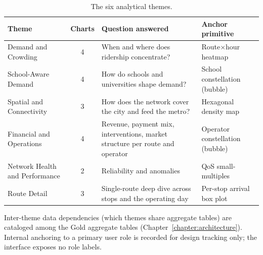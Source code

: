 \begin{table}[!htbp]
  \centering
  \caption{The six analytical themes.}
  \label{tab:themes:six}
  \footnotesize
  \renewcommand{\arraystretch}{1.3}
  \begin{tabularx}{\linewidth}{p{3.0cm} c X p{2.6cm}}
    \hline
    \textbf{Theme} & \textbf{Charts} & \textbf{Question answered} & \textbf{Anchor primitive} \\
    \hline
    Demand and Crowding            & 4 & When and where does ridership concentrate?                                      & Route$\times$hour heatmap \\
    School-Aware Demand            & 4 & How do schools and universities shape demand?                                   & School constellation (bubble) \\
    Spatial and Connectivity       & 3 & How does the network cover the city and feed the metro?                         & Hexagonal density map \\
    Financial and Operations       & 4 & Revenue, payment mix, interventions, market structure per route and operator    & Operator constellation (bubble) \\
    Network Health and Performance & 2 & Reliability and anomalies                                                       & QoS small-multiples \\
    Route Detail                   & 3 & Single-route deep dive across stops and the operating day                       & Per-stop arrival box plot \\
    \hline
  \end{tabularx}
\end{table}

Inter-theme data dependencies (which themes share aggregate tables) are
cataloged among the Gold aggregate tables (Chapter~\ref{chapter:architecture}). Internal anchoring to
a primary user role is recorded for design tracking only; the
interface exposes no role labels.

